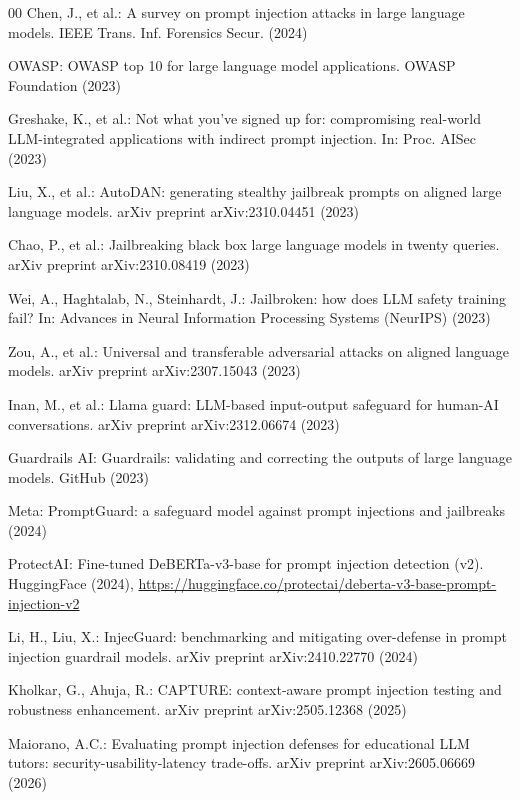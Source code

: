 \documentclass[runningheads]{llncs}
\newif\ifrev
\newcommand{\rev}[1]{\ifrev\hl{#1}\else#1\fi}                  %
\begin{document}
\begin{thebibliography}{00}
Chen, J., et al.: A survey on prompt injection attacks in large language models. IEEE Trans. Inf. Forensics Secur. (2024)

OWASP: OWASP top 10 for large language model applications. OWASP Foundation (2023)

Greshake, K., et al.: Not what you've signed up for: compromising real-world LLM-integrated applications with indirect prompt injection. In: Proc. AISec (2023)

Liu, X., et al.: AutoDAN: generating stealthy jailbreak prompts on aligned large language models. arXiv preprint arXiv:2310.04451 (2023)

Chao, P., et al.: Jailbreaking black box large language models in twenty queries. arXiv preprint arXiv:2310.08419 (2023)

Wei, A., Haghtalab, N., Steinhardt, J.: Jailbroken: how does LLM safety training fail? In: Advances in Neural Information Processing Systems (NeurIPS) (2023)

Zou, A., et al.: Universal and transferable adversarial attacks on aligned language models. arXiv preprint arXiv:2307.15043 (2023)

Inan, M., et al.: Llama guard: LLM-based input-output safeguard for human-AI conversations. arXiv preprint arXiv:2312.06674 (2023)

Guardrails AI: Guardrails: validating and correcting the outputs of large language models. GitHub (2023)

Meta: PromptGuard: a safeguard model against prompt injections and jailbreaks (2024)

\rev{ProtectAI: Fine-tuned DeBERTa-v3-base for prompt injection detection (v2). HuggingFace (2024),} \url{https://huggingface.co/protectai/deberta-v3-base-prompt-injection-v2}

Li, H., Liu, X.: InjecGuard: benchmarking and mitigating over-defense in prompt injection guardrail models. arXiv preprint arXiv:2410.22770 (2024)

Kholkar, G., Ahuja, R.: CAPTURE: context-aware prompt injection testing and robustness enhancement. arXiv preprint arXiv:2505.12368 (2025)

Maiorano, A.C.: Evaluating prompt injection defenses for educational LLM tutors: security-usability-latency trade-offs. arXiv preprint arXiv:2605.06669 (2026)


\end{thebibliography}
\end{document}
